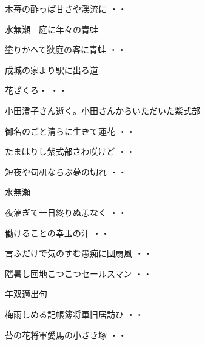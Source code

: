 \begin{shiika}木苺の酢っぱ甘さや渓流に
\hfill{・・}\end{shiika}
\vspace{0.6cm}
水無瀬　庭に年々の青蛙
\begin{shiika}塗りかへて狭庭の客に青蛙
\hfill{・・}\end{shiika}
\vspace{0.6cm}
成城の家より駅に出る道
\begin{shiika}花ざくろ・
\hfill{・・}\end{shiika}
\vspace{0.6cm}
小田澄子さん逝く。小田さんからいただいた紫式部
\begin{shiika}御名のごと清らに生きて蓮花
\hfill{・・}\end{shiika}
\begin{shiika}たまはりし紫式部さわ咲けど
\hfill{・・}\end{shiika}
\begin{shiika}短夜や句机ならぶ夢の切れ
\hfill{・・}\end{shiika}
\vspace{0.6cm}
水無瀬
\begin{shiika}夜濯ぎて一日終りぬ恙なく
\hfill{・・}\end{shiika}
\vspace{0.6cm}
\begin{shiika}働けることの幸玉の汗
\hfill{・・}\end{shiika}
\vspace{0.6cm}
\begin{shiika}言ふだけで気のすむ愚痴に団扇風
\hfill{・・}\end{shiika}
\vspace{0.6cm}
\begin{shiika}階暑し団地こつこつセールスマン
\hfill{・・}\end{shiika}
\vspace{0.6cm}
年双適出句
\begin{shiika}梅雨しめる記帳簿将軍旧居訪ひ
\hfill{・・}\end{shiika}
\begin{shiika}苔の花将軍愛馬の小さき塚
\hfill{・・}\end{shiika}
